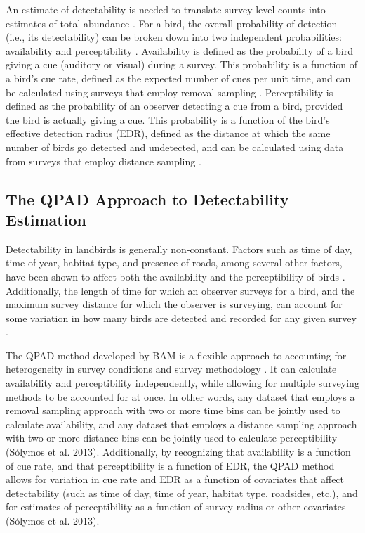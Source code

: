 \par An estimate of detectability is needed to translate survey-level counts into estimates of total abundance \citep{rosenberg_setting_2005, stanton_estimating_2019}. For a bird, the overall probability of detection (i.e., its detectability) can be broken down into two independent probabilities: availability and perceptibility \citep{marsh_correcting_1989, johnson_defense_2008}. Availability is defined as the probability of a bird giving a cue (auditory or visual) during a survey. This probability is a function of a bird’s cue rate, defined as the expected number of cues per unit time, and can be calculated using surveys that employ removal sampling \citep{barker_statistical_1995, farnsworth_removal_2002, alldredge_time--detection_2007}. Perceptibility is defined as the probability of an observer detecting a cue from a bird, provided the bird is actually giving a cue. This probability is a function of the bird’s effective detection radius (EDR), defined as the distance at which the same number of birds go detected and undetected, and can be calculated using data from surveys that employ distance sampling \citep{buckland_introduction_2001, buckland_distance_2015}.

\subsection{The QPAD Approach to Detectability Estimation}
\par Detectability in landbirds is generally non-constant. Factors such as time of day, time of year, habitat type, and presence of roads, among several other factors, have been shown to affect both the availability and the perceptibility of birds \citep{wilson_reliability_1985, solymos_calibrating_2013, johnston_species_2014, cooke_road_2020}. Additionally, the length of time for which an observer surveys for a bird, and the maximum survey distance for which the observer is surveying, can account for some variation in how many birds are detected and recorded for any given survey \citep{alldredge_factors_2007, solymos_calibrating_2013, buckland_distance_2015}.  

\par The QPAD method developed by BAM is a flexible approach to accounting for heterogeneity in survey conditions and survey methodology \citep{solymos_calibrating_2013}. It can calculate availability and perceptibility independently, while allowing for multiple surveying methods to be accounted for at once. In other words, any dataset that employs a removal sampling approach with two or more time bins can be jointly used to calculate availability, and any dataset that employs a distance sampling approach with two or more distance bins can be jointly used to calculate perceptibility (Sólymos et al. 2013). Additionally, by recognizing that availability is a function of cue rate, and that perceptibility is a function of EDR, the QPAD method allows for variation in cue rate and EDR as a function of covariates that affect detectability (such as time of day, time of year, habitat type, roadsides, etc.), and for estimates of perceptibility as a function of survey radius or other covariates (Sólymos et al. 2013). 

